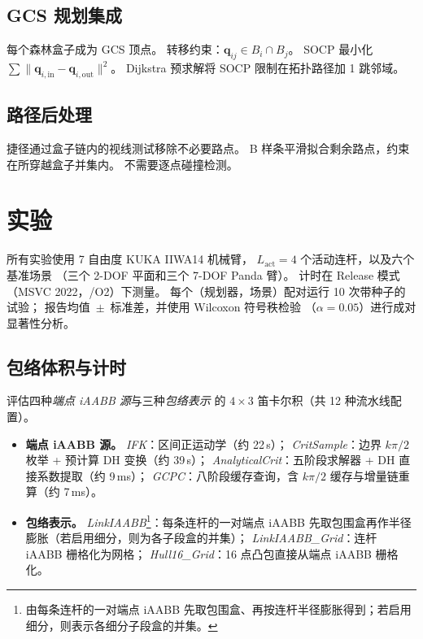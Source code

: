 \documentclass[journal]{IEEEtran}
\newcommand{\LinkIAABBDef}{由每条连杆的一对端点 iAABB 先取包围盒、再按连杆半径膨胀得到；若启用细分，则表示各细分子段盒的并集。}
\begin{document}
\subsection{GCS 规划集成}\label{sec:gcs_planning}

每个森林盒子成为 GCS 顶点。
转移约束：$\bm{q}_{ij} \in B_i \cap B_j$。
SOCP 最小化 $\sum \|\bm{q}_{i,\text{in}} - \bm{q}_{i,\text{out}}\|^2$。
Dijkstra 预求解将 SOCP 限制在拓扑路径加 1 跳邻域。

\subsection{路径后处理}\label{sec:post_process}

捷径通过盒子链内的视线测试移除不必要路点。
B 样条平滑拟合剩余路点，约束在所穿越盒子并集内。
不需要逐点碰撞检测。

\section{实验}\label{sec:experiments}


所有实验使用 7 自由度 KUKA IIWA14 机械臂，
$L_\text{act}{=}4$ 个活动连杆，以及六个基准场景
（三个 2-DOF 平面和三个 7-DOF Panda 臂）。
计时在 Release 模式（MSVC 2022，/O2）下测量。
每个（规划器，场景）配对运行 10 次带种子的试验；
报告均值~$\pm$~标准差，并使用 Wilcoxon 符号秩检验
（$\alpha{=}0.05$）进行成对显著性分析。

\subsection{包络体积与计时}\label{sec:exp_pipeline}

评估四种\emph{端点 iAABB 源}与三种\emph{包络表示}
的 $4{\times}3$ 笛卡尔积（共 12 种流水线配置）。

\begin{itemize}
  \item \textbf{端点 iAABB 源。}
    \emph{IFK}：区间正运动学（约 22\,\textmu s）；
    \emph{CritSample}：边界 $k\pi/2$ 枚举 + 预计算 DH 变换（约 39\,\textmu s）；
    \emph{AnalyticalCrit}：五阶段求解器 + DH 直接系数提取（约 9\,ms）；
    \emph{GCPC}：八阶段缓存查询，含 $k\pi/2$ 缓存与增量链重算（约 7\,ms）。
  \item \textbf{包络表示。}
    \emph{LinkIAABB}\footnote{\LinkIAABBDef}：每条连杆的一对端点 iAABB 先取包围盒再作半径膨胀（若启用细分，则为各子段盒的并集）；
    \emph{LinkIAABB\_Grid}：连杆 iAABB 栅格化为网格；
    \emph{Hull16\_Grid}：16 点凸包直接从端点 iAABB 栅格化。
\end{itemize}
\end{document}
